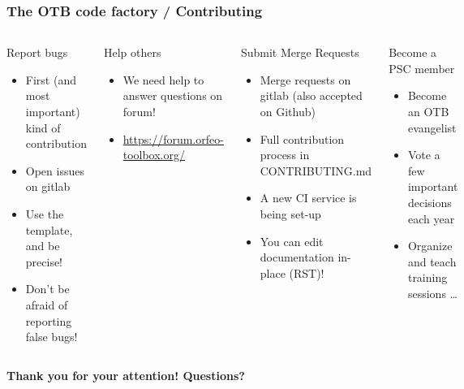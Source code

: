 \documentclass[8pt,aspectratio=169]{beamer}
\begin{document}
    \begin{frame}[fragile]
    \frametitle{The OTB code factory / Contributing}

    \begin{columns}
      \begin{block}{Report bugs}
        \begin{itemize}
        \item First (and most important) kind of contribution
        \item Open issues on gitlab
        \item Use the template, and be precise!
        \item Don't be afraid of reporting false bugs!
        \end{itemize}
      \end{block}

      \begin{block}{Help others}
        \begin{itemize}
        \item We need help to answer questions on forum!
        \item \small{\url{https://forum.orfeo-toolbox.org/}}
        \end{itemize}
      \end{block}
    
      \begin{block}{Submit Merge Requests}
        \begin{itemize}
        \item Merge requests on gitlab (also accepted on Github)
        \item Full contribution process in CONTRIBUTING.md
        \item A new CI service is being set-up
        \item You can edit documentation in-place (RST)!
        \end{itemize}
      \end{block}

      \begin{block}{Become a PSC member}
        \begin{itemize}
          \item Become an OTB evangelist
          \item Vote a few important decisions each year
          \item Organize and teach training sessions \ldots
        \end{itemize}
      \end{block}
      
    \end{columns}

    \begin{center}
      \large{\textbf{Thank you for your attention! Questions?}}
      
    \end{center}
    
    \end{frame}
\end{document}
